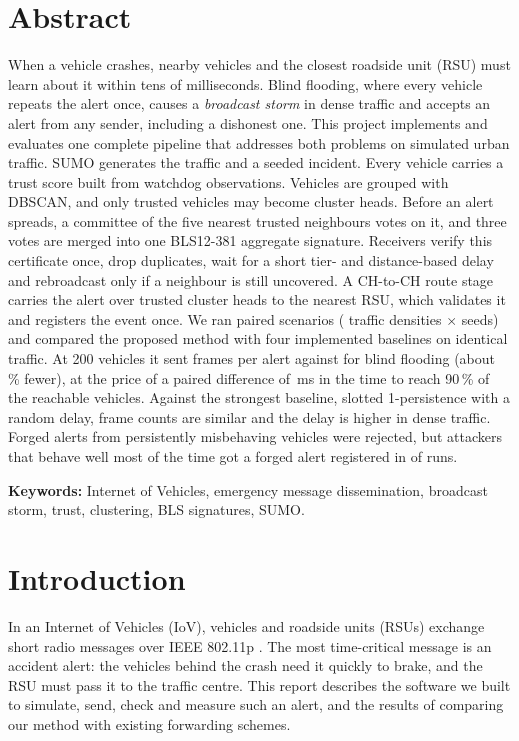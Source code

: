\documentclass[11pt, a4paper]{article}
\begin{document}
\section*{Abstract}
\noindent
When a vehicle crashes, nearby vehicles and the closest roadside unit (RSU) must learn about it within tens of
milliseconds. Blind flooding, where every vehicle repeats the alert once, causes a \emph{broadcast storm} in dense traffic
and accepts an alert from any sender, including a dishonest one. This project implements and evaluates one complete
pipeline that addresses both problems on simulated urban traffic. SUMO generates the traffic and a seeded incident.
Every vehicle carries a trust score built from watchdog observations. Vehicles are grouped with DBSCAN, and only trusted
vehicles may become cluster heads. Before an alert spreads, a committee of the five nearest trusted neighbours votes on
it, and three votes are merged into one BLS12-381 aggregate signature. Receivers verify this certificate once, drop
duplicates, wait for a short tier- and distance-based delay and rebroadcast only if a neighbour is still uncovered. A
CH-to-CH route stage carries the alert over trusted cluster heads to the nearest RSU, which validates it and registers
the event once. We ran \NScenarios{} paired scenarios (\NDensities{} traffic densities $\times$ \NRuns{} seeds) and compared
the proposed method with four implemented baselines on identical traffic. At 200 vehicles it sent \NFrProp{} frames per
alert against \NFrFlood{} for blind flooding (about \NCutVsFlood\,\% fewer), at the price of a paired difference of
\NDTnFlood{}\,ms in the time to reach 90\,\% of the reachable vehicles. Against the strongest baseline, slotted 1-persistence with a random delay, frame counts
are similar and the delay is higher in dense traffic. Forged alerts from persistently misbehaving vehicles were rejected,
but attackers that behave well most of the time got a forged alert registered in \NForgOnOffNine{} of \NRuns{} runs.

\noindent\textbf{Keywords:} Internet of Vehicles, emergency message dissemination, broadcast storm, trust, clustering,
BLS signatures, SUMO.

\newpage
\tableofcontents
\newpage

\section{Introduction}
In an Internet of Vehicles (IoV), vehicles and roadside units (RSUs) exchange short radio messages over IEEE 802.11p
\cite{ieee80211p}. The most time-critical message is an accident alert: the vehicles behind the crash need it quickly to
brake, and the RSU must pass it to the traffic centre. This report describes the software we built to simulate, send,
check and measure such an alert, and the results of comparing our method with existing forwarding schemes.
\end{document}
